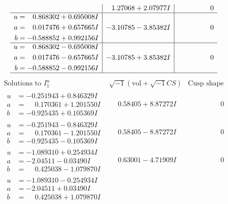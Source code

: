 \documentclass[1p]{elsarticle_modified}
\theoremstyle{definition}
\newcommand{\I}{\sqrt{-1}}
\begin{document}
$$\begin{array}{c|c|c}
 & \phantom{-}1.27068 + 2.07977 I & \phantom{-0.000000 } 0 \\ \hline\begin{aligned}
u &= \phantom{-}0.868302 + 0.695008 I \\
a &= \phantom{-}0.017476 + 0.657665 I \\
b &= -0.588852 + 0.992156 I\end{aligned}
 & -3.10785 - 3.85382 I & \phantom{-0.000000 } 0 \\ \hline\begin{aligned}
u &= \phantom{-}0.868302 - 0.695008 I \\
a &= \phantom{-}0.017476 - 0.657665 I \\
b &= -0.588852 - 0.992156 I\end{aligned}
 & -3.10785 + 3.85382 I & \phantom{-0.000000 } 0\\
 \hline 
 \end{array}$$\newpage$$\begin{array}{c|c|c}  
\text{Solutions to }I^u_{1}& \I (\text{vol} + \sqrt{-1}CS) & \text{Cusp shape}\\
 \hline 
\begin{aligned}
u &= -0.251943 + 0.846329 I \\
a &= \phantom{-}0.170361 + 1.201550 I \\
b &= -0.925435 + 0.105369 I\end{aligned}
 & \phantom{-}0.58405 + 8.87272 I & \phantom{-0.000000 } 0 \\ \hline\begin{aligned}
u &= -0.251943 - 0.846329 I \\
a &= \phantom{-}0.170361 - 1.201550 I \\
b &= -0.925435 - 0.105369 I\end{aligned}
 & \phantom{-}0.58405 - 8.87272 I & \phantom{-0.000000 } 0 \\ \hline\begin{aligned}
u &= -1.089310 + 0.254934 I \\
a &= -2.04511 - 0.03490 I \\
b &= \phantom{-}0.425038 - 1.079870 I\end{aligned}
 & \phantom{-}0.63001 - 4.71909 I & \phantom{-0.000000 } 0 \\ \hline\begin{aligned}
u &= -1.089310 - 0.254934 I \\
a &= -2.04511 + 0.03490 I \\
b &= \phantom{-}0.425038 + 1.079870 I\end{aligned}

\end{array}$$
\end{document}
